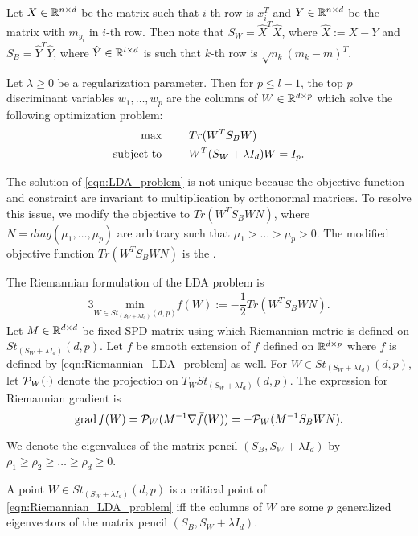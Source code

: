 \documentclass[11pt,a4paper]{article}
\begin{document}
Let $X\in\mathbb{R}^{n\times d}$ be the matrix such that $i$-th row is $x_i^T$ and $Y\in \mathbb{R}^{n\times d}$ be the matrix with $m_{y_i}$ in $i$-th row. Then note that $S_W = \hat{X}^T\hat{X}$, where $\hat{X} := X-Y$ and $S_B = \hat{Y}^T\hat{Y}$, where $\hat{Y}\in\mathbb{R}^{l\times d}$ is such that $k$-th row is $\sqrt{n_k}(m_k-m)^T$.

Let $\lambda\ge 0$ be a regularization parameter. Then for $p\le l-1$, the top $p$ discriminant variables $w_1,\ldots,w_p$ are the columns of $W\in\mathbb{R}^{d\times p}$ which solve the following optimization problem:
\begin{alignat}{3}
{\text{max}}& &&Tr(W^TS_BW) \nonumber\\
\text{subject to}&\hspace{0.5cm} &&W^T (S_W+\lambda I_d) W = I_p. \label{eqn:LDA_problem}
\end{alignat}

The solution of \eqref{eqn:LDA_problem} is not unique because the objective function and constraint are invariant to multiplication by orthonormal matrices. To resolve this issue, we modify the objective to $Tr(W^TS_BWN)$, where $N = diag(\mu_1,\ldots,\mu_p)$ are arbitrary such that $\mu_1>\ldots>\mu_p>0$. The modified objective function $Tr(W^TS_BWN)$ is the .

The Riemannian formulation of the LDA problem is 
\begin{alignat}{3}
\underset{W\in St_{(S_W+\lambda I_d)}(d,p)}{\text{min}} f(W) := -\dfrac{1}{2} Tr(W^TS_BWN). \label{eqn:Riemannian_LDA_problem}
\end{alignat}
Let $M\in \mathbb{R}^{d\times d}$ be fixed SPD matrix using which Riemannian metric is defined on $St_{(S_W+\lambda I_d)}(d,p)$. Let $\bar{f}$ be smooth extension of $f$ defined on $\mathbb{R}^{d\times p}$ where $\bar{f}$ is defined by \eqref{eqn:Riemannian_LDA_problem} as well. For $W\in St_{(S_W+\lambda I_d)}(d,p)$, let $\mathcal{P}_W(\cdot)$ denote the projection on $T_W St_{(S_W+\lambda I_d)}(d,p)$. The expression for Riemannian gradient is 
\begin{equation}
\text{grad}\, f(W) = \mathcal{P}_W (M^{-1}\nabla \bar{f}(W)) = -\mathcal{P}_W (M^{-1}S_B WN).
\end{equation}

We denote the eigenvalues of the matrix pencil $(S_B,S_W+\lambda I_d)$ by $\rho_1\ge \rho_2\ge\ldots\ge \rho_d\ge 0$.

\begin{prop}
A point $W\in St_{(S_W+\lambda I_d)}(d,p)$ is a critical point of \eqref{eqn:Riemannian_LDA_problem} iff the columns of $W$ are some $p$ generalized eigenvectors of the matrix pencil $(S_B,S_W+\lambda I_d)$.
\end{prop}
\end{document}
